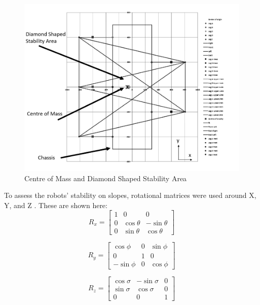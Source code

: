 \begin{figure}[H]
    \centering
    \includegraphics[width=\textwidth]{5_KinematicAndForces/img/CentreMass.PNG}
    \caption{Centre of Mass and Diamond Shaped Stability Area}
    \label{fig:centreMass}
\end{figure}

To assess the robots' stability on slopes, rotational matrices were used around X, Y, and Z \cite{al-jarrah_mcg4134:_2019}. These are shown here:
\begin{equation}
    R_x = \left[ \begin{array}{ccc} 
    1 & 0 & 0 
    \\ 
    0 & \cos\theta & -\sin\theta 
    \\ 
    0 & \sin\theta & \cos\theta
    \end{array} \right] 
\end{equation}
    
\begin{equation}
    R_y = \left[ \begin{array}{ccc} 
    \cos\phi & 0 & \sin\phi 
    \\ 
    0 & 1 & 0 
    \\ 
    -\sin\phi & 0 & \cos\phi
    \end{array} \right] 
\end{equation}
    
\begin{equation}
    R_z = \left[ \begin{array}{ccc} 
    \cos\sigma & -\sin\sigma & 0
    \\ 
    \sin\sigma & \cos\sigma & 0 
    \\ 
    0 & 0 & 1
    \end{array} \right] 
\end{equation}

